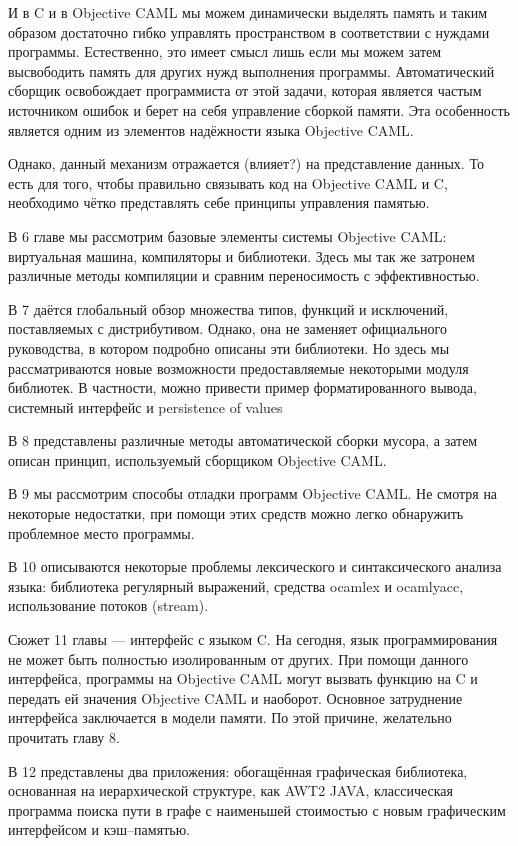 И в C и в Objective CAML мы можем динамически выделять память и таким образом
достаточно гибко управлять пространством в соответствии с нуждами программы.
Естественно, это имеет смысл лишь если мы можем затем высвободить память для
других нужд выполнения программы. Автоматический сборщик освобождает
программиста от этой задачи, которая является частым источником ошибок и берет
на себя управление сборкой памяти. Эта особенность является одним из элементов
надёжности языка Objective CAML.

Однако, данный механизм отражается (влияет?) на представление данных. То есть
для того, чтобы правильно связывать код на Objective CAML и C, необходимо чётко
представлять себе принципы управления памятью.

В 6 главе мы рассмотрим базовые элементы системы Objective CAML: виртуальная
машина, компиляторы и библиотеки. Здесь мы так же затронем различные методы
компиляции и сравним переносимость с эффективностью.

В 7 даётся глобальный обзор множества типов, функций и исключений, поставляемых
с дистрибутивом. Однако, она не заменяет официального руководства, в котором
подробно описаны эти библиотеки. Но здесь мы рассматриваются новые возможности
предоставляемые некоторыми модуля библиотек. В частности, можно привести пример
форматированного вывода, системный интерфейс и persistence of values

В 8 представлены различные методы автоматической сборки мусора, а затем описан
принцип, используемый сборщиком Objective CAML.

В 9 мы рассмотрим способы отладки программ Objective CAML. Не смотря на
некоторые недостатки, при помощи этих средств можно легко обнаружить проблемное
место программы.

В 10 описываются некоторые проблемы лексического и синтаксического анализа
языка: библиотека регулярный выражений, средства ocamlex и ocamlyacc,
использование потоков (stream).

Сюжет 11 главы — интерфейс с языком C. На сегодня, язык программирования не
может быть полностью изолированным от других. При помощи данного интерфейса,
программы на Objective CAML могут вызвать функцию на C и передать ей значения
Objective CAML и наоборот. Основное затруднение интерфейса заключается в модели
памяти. По этой причине, желательно прочитать главу 8.

В 12 представлены два приложения: обогащённая графическая библиотека, основанная
на иерархической структуре, как AWT2 JAVA, классическая программа поиска пути в
графе с наименьшей стоимостью с новым графическим интерфейсом и кэш--памятью.